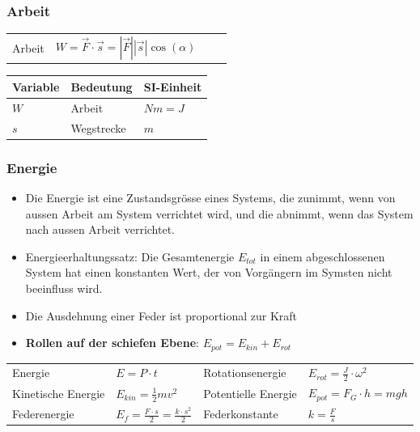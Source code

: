 \documentclass[
a4paper,
oneside,
landscape, 
8pt,
]{scrartcl}
\begin{document}
\begin{multicols*}{2}
\subsubsection{Arbeit}

\begin{tabbing}
	\begin{tabu} to \linewidth {l X l X}
		\toprule
		Arbeit & $W = \vec F \cdot \vec s = |\vec F| |\vec s| \cos(\alpha)\,$  &
		& \\
	\end{tabu}
\end{tabbing}

\begin{tabbing}
	\begin{tabu} to \linewidth {l X l}
		Variable & Bedeutung & SI-Einheit \\
		\midrule
		$W$ & Arbeit & $Nm = J$ \\
		$s$ & Wegstrecke & $m$ \\
		\bottomrule
	\end{tabu}
\end{tabbing}

\subsubsection{Energie}
\begin{itemize}
	\item Die Energie ist eine Zustandsgrösse eines Systems, die zunimmt, wenn von aussen Arbeit am System verrichtet wird, und die abnimmt, wenn das System nach aussen Arbeit verrichtet.
	\item Energieerhaltungssatz: Die Gesamtenergie $E_{tot}$ in einem abgeschlossenen System hat einen konstanten Wert, der von Vorgängern im Symsten nicht beeinfluss wird.
	\item Die Ausdehnung einer Feder ist proportional zur Kraft
	\item \textbf{Rollen auf der schiefen Ebene}: $E_{pot} = E_{kin} + E_{rot}$
\end{itemize}
\begin{tabbing}
	\begin{tabu} to \linewidth {l X l X}
		\toprule
		Energie & $E = P \cdot t$ & Rotationsenergie & $E_{rot} = \frac{J}{2} \cdot \omega^2 $\\
		Kinetische Energie & $E_{kin} = \frac{1}{2}mv^2$ &
		Potentielle Energie & $E_{pot} = F_G \cdot h =  mgh$ \\
		Federenergie & $E_f = \frac{F \cdot s}{2} = \frac{k \cdot s^2}{2}$ &
		Federkonstante & $k = \frac{F}{s}$ \\
	\end{tabu}
\end{tabbing}


\end{multicols*}
\end{document}
